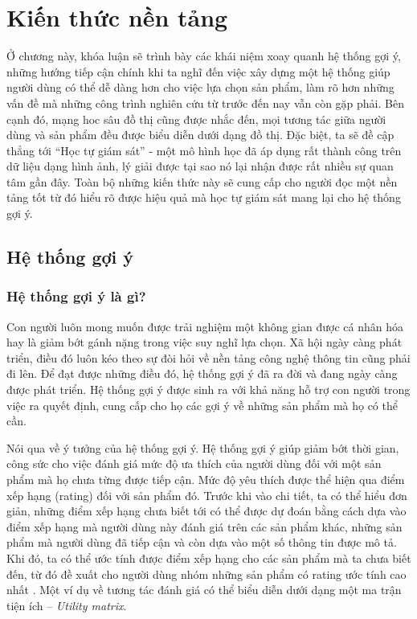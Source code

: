 \chapter{Kiến thức nền tảng} \label{Chapter2}
\noindent Ở chương này, khóa luận sẽ trình bày các khái niệm xoay quanh hệ thống gợi ý, những hướng tiếp cận chính khi ta nghĩ đến việc xây dựng một hệ thống giúp người dùng có thể dễ dàng hơn cho việc lựa chọn sản phẩm, làm rõ hơn những vấn đề mà những công trình nghiên cứu từ trước đến nay vẫn còn gặp phải. Bên cạnh đó, mạng hoc sâu đồ thị cũng được nhắc đến, mọi tương tác giữa người dùng và sản phẩm đều được biểu diễn dưới dạng đồ thị. Đặc biệt, ta sẽ đề cập thẳng tới ``Học tự giám sát'' - một mô hình học đã áp dụng rất thành công trên dữ liệu dạng hình ảnh, lý giải được tại sao nó lại nhận được rất nhiều sự quan tâm gần đây. Toàn bộ những kiến thức này sẽ cung cấp cho người đọc một nền tảng tốt từ đó hiểu rõ được hiệu quả mà học tự giám sát mang lại cho hệ thống gợi ý.

\section{Hệ thống gợi ý}

\subsection{Hệ thống gợi ý là gì?}

\noindent Con người luôn mong muốn được trải nghiệm một không gian được cá nhân hóa hay là giảm bớt gánh nặng trong việc suy nghĩ lựa chọn. Xã hội ngày càng phát triển, điều đó luôn kéo theo sự đòi hỏi về nền tảng công nghệ thông tin cũng phải đi lên. Để đạt được những điều đó, hệ thống gợi ý đã ra đời và đang ngày càng được phát triển. Hệ thống gợi ý được sinh ra với khả năng hỗ trợ con người trong việc ra quyết định, cung cấp cho họ các gợi ý về những sản phẩm mà họ có thể cần.

Nói qua về ý tưởng của hệ thống gợi ý. Hệ thống gợi ý giúp giảm bớt thời gian, công sức cho việc đánh giá mức độ ưa thích của người dùng đối với một sản phẩm mà họ chưa từng được tiếp cận. Mức độ yêu thích được thể hiện qua điểm xếp hạng (rating) đối với sản phẩm đó. Trước khi vào chi tiết, ta có thể hiểu đơn giản, những điểm xếp hạng chưa biết tới có thể được dự đoán bằng cách dựa vào điểm xếp hạng mà người dùng này đánh giá trên các sản phẩm khác, những sản phẩm mà người dùng đã tiếp cận và còn dựa vào một số thông tin được mô tả. Khi đó, ta có thể ước tính được điểm xếp hạng cho các sản phẩm mà ta chưa biết đến, từ đó đề xuất cho người dùng nhóm những sản phẩm có rating ước tính cao nhất \cite{survey:sota-rec-system}. Một ví dụ về tương tác đánh giá có thể biểu diễn dưới dạng một ma trận tiện ích -- \textit{Utility matrix}.

